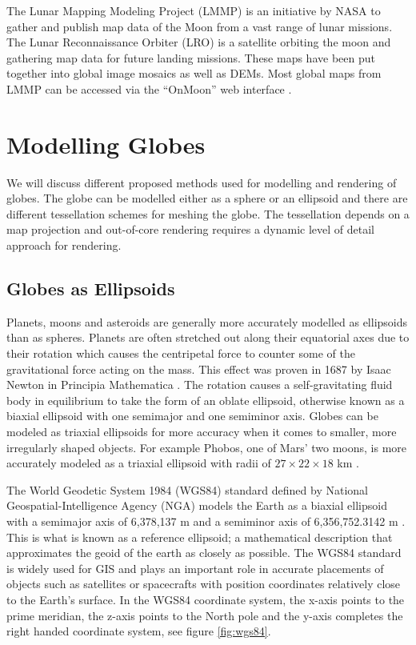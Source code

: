 The Lunar Mapping Modeling Project (LMMP) is an initiative by NASA to gather and publish map data of the Moon from a vast range of lunar missions. The Lunar Reconnaissance Orbiter (LRO) is a satellite orbiting the moon and gathering map data for future landing missions. These maps have been put together into global image mosaics as well as DEMs. Most global maps from LMMP can be accessed via the ``OnMoon'' web interface \cite{onmoon}.



\section{Modelling Globes}

We will discuss different proposed methods used for modelling and rendering of globes. The globe can be modelled either as a sphere or an ellipsoid and there are different tessellation schemes for meshing the globe. The tessellation depends on a map projection and out-of-core rendering requires a dynamic level of detail approach for rendering.

\subsection{Globes as Ellipsoids}

Planets, moons and asteroids are generally more accurately modelled as ellipsoids than as spheres. Planets are often stretched out along their equatorial axes due to their rotation which causes the centripetal force to counter some of the gravitational force acting on the mass. This effect was proven in 1687 by Isaac Newton in Principia Mathematica \cite{newton87}. The rotation causes a self-gravitating fluid body in equilibrium to take the form of an oblate ellipsoid, otherwise known as a biaxial ellipsoid with one semimajor and one semiminor axis. Globes can be modeled as triaxial ellipsoids for more accuracy when it comes to smaller, more irregularly shaped objects. For example Phobos, one of Mars' two moons, is more accurately modeled as a triaxial ellipsoid with radii of $27 \times 22 \times 18$ km \cite{cozzi11}.

The World Geodetic System 1984 (WGS84) standard defined by National Geospatial-Intelligence Agency (NGA) models the Earth as a biaxial ellipsoid with a semimajor axis of 6,378,137 m and a semiminor axis of 6,356,752.3142 m \cite{cozzi11}. This is what is known as a reference ellipsoid; a mathematical description that approximates the geoid of the earth as closely as possible. The WGS84 standard is widely used for GIS and plays an important role in accurate placements of objects such as satellites or spacecrafts with position coordinates relatively close to the Earth's surface. In the WGS84 coordinate system, the x-axis points to the prime meridian, the z-axis points to the North pole and the y-axis completes the right handed coordinate system, see figure \ref{fig:wgs84}.

